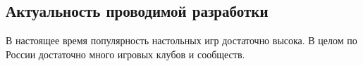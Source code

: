 \subsection{Актуальность проводимой разработки}

В настоящее время популярность настольных игр достаточно высока. В целом по России достаточно много игровых клубов и сообществ.
